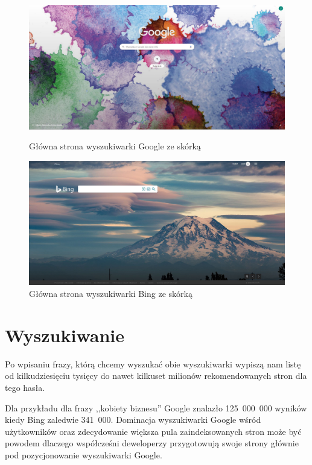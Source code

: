 \documentclass[licencjacka]{pracadypl}
\theoremstyle{definition}
\begin{document}
\begin{figure}[!htb]
	\includegraphics[width=\linewidth]{img/google-background}
	\caption{Główna strona wyszukiwarki Google ze skórką} \label{google-background}
	\endminipage\hfill 
	\includegraphics[width=\linewidth]{img/bing-background}
	\caption{Główna strona wyszukiwarki Bing ze skórką} \label{bing-background}
	\endminipage
\end{figure}

\section{Wyszukiwanie}

Po wpisaniu frazy, którą chcemy wyszukać obie wyszukiwarki wypiszą nam listę od kilkudziesięciu tysięcy do nawet kilkuset milionów rekomendowanych stron dla tego hasła.

Dla przykładu dla frazy ,,kobiety biznesu'' Google znalazło 125~000~000 wyników kiedy Bing zaledwie  341~000. Dominacja wyszukiwarki Google wśród użytkowników oraz zdecydowanie większa pula zaindeksowanych stron może być powodem dlaczego współcześni deweloperzy przygotowują swoje strony głównie pod pozycjonowanie wyszukiwarki Google.
\end{document}

